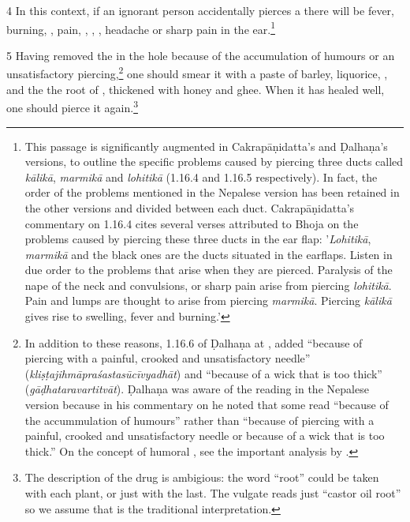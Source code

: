 \begin{translation}
    \item [4] In this context, if an ignorant person accidentally pierces a
 there will be fever, burning, , pain,
, ,
, headache or sharp pain in the ear.\footnote{This
    passage is significantly augmented in Cakrapāṇidatta's and Ḍalhaṇa's versions,
    to outline the specific problems caused by piercing three ducts called
    \emph{kālikā}, \emph{marmikā} and \emph{lohitikā} (1.16.4
    \citep[126]{acar-1939} and 1.16.5 \citep[77]{vulgate} respectively). In fact,
    the order of the problems mentioned in the Nepalese version has been retained
    in the other versions and divided between each duct. Cakrapāṇidatta's
    commentary on 1.16.4 \citep[126]{acar-1939} cites several verses attributed to
    Bhoja on the problems caused by piercing these three ducts in the ear flap:
    '\emph{Lohitikā}, \emph{marmikā} and the black ones are the ducts situated in
    the earflaps.  Listen in due order to the problems that arise when they are
    pierced. Paralysis of the nape of the neck and convulsions, or sharp pain
    arise from piercing \emph{lohitikā}. Pain and lumps are thought to arise from
    piercing \emph{marmikā}. Piercing \emph{kālikā} gives rise to swelling, fever
    and burning.'}
    
    \item[5]     Having removed the  in the hole because of the
accumulation of humours or an unsatisfactory piercing,\footnote{In addition to
these reasons, 1.16.6 of Ḍalhaṇa at , added “because of
piercing with a painful, crooked and unsatisfactory needle”
(\emph{kliṣṭajihmāpraśastasūcīvyadhāt}) and  “because of a wick that is too
thick” (\emph{gāḍhataravartitvāt}). Ḍalhaṇa was aware of the reading in the
Nepalese version because in his commentary on  he noted that
some read “because of the accummulation of humours” rather than “because of
piercing with a painful, crooked and unsatisfactory needle or because of a
wick that is too thick.” On the concept of humoral
, see the important analysis by \citet{meul-1992}.}
one should smear it with a paste of barley, liquorice,
, and the the root of ,
thickened with honey and ghee. When it has healed well, one should pierce it
again.\footnote{The description of the drug is ambigious: the word “root” could be taken with 
each plant, or just with the last.  The vulgate reads just “castor oil root” so we assume that is 
the traditional interpretation.}
    

\end{translation}

